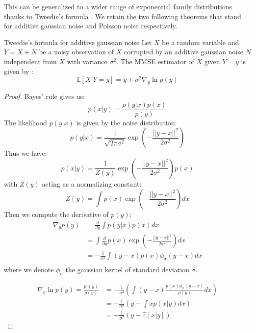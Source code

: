 This can be generalized to a wider range of exponential family distributions thanks to Tweedie's formula \cite{efron_tweedies_2011}. We retain the two following theorems that stand for additive gaussian noise and Poisson noise respectively.

\begin{theorem}{Tweedie's formula for additive gaussian noise}
    \label{theorem:tweedie_gaussian}
    Let $X$ be a random variable and $Y = X + N$ be a noisy observation of $X$ corrupted by an additive gaussian noise $N$ independent from $X$ with variance $\sigma^2$. The MMSE estimator of $X$ given $Y = y$ is given by :
    \begin{equation}
        \mathbb{E}\left[X | Y = y\right] = y + \sigma^2 \nabla_y \ln p(y)
    \end{equation}
\end{theorem}

\begin{proof}
    Bayes' rule gives us:
    \begin{equation*}
        p(x|y) = \frac{p(y|x)p(x)}{p(y)}
    \end{equation*}
    The likelihood $p(y|x)$ is given by the noise distribution:
    \begin{equation*}
        p(y|x) = \frac{1}{\sqrt{2 \pi \sigma^2}} \exp\left(-\frac{||y - x||^2}{2 \sigma^2}\right)
    \end{equation*}
    Thus we have:
    \begin{equation*}
        p(x|y) = \frac{1}{Z(y)} \exp\left(-\frac{||y - x||^2}{2 \sigma^2}\right) p(x)
    \end{equation*}
    with $Z(y)$ acting as a normalizing constant:
    \begin{equation*}
        Z(y) = \int p(x) \exp\left(-\frac{||y - x||^2}{2 \sigma^2}\right)dx
    \end{equation*}
    Then we compute the derivative of $p(y)$:
    \begin{align*}
        \nabla_y p(y) &= \frac{d}{dy} \int p(y|x)p(x) dx \\
        &= \int \frac{\partial}{\partial y} p(x) \exp\left(-\frac{||y - x||^2}{2 \sigma^2}\right) dx \\
        &= - \frac{1}{\sigma^2} \int (y - x) p(x) \phi_{\sigma}(y - x) dx \\
    \end{align*}
    where we denote $\phi_{\sigma}$ the gaussian kernel of standard deviation $\sigma$.

    \begin{align*}
        \nabla_y \ln p(y) = \frac{p'(y)}{p(y)} &= - \frac{1}{\sigma^2} \left( \int (y - x) \frac{p(x) \phi_{\sigma}(y - x)}{p(y)} dx \right) \\
        &= - \frac{1}{\sigma^2} \left( y - \int x p(x|y) dx \right) \\
        &= - \frac{1}{\sigma^2} (y - \mathbb{E}[x|y])
    \end{align*}
\end{proof}

